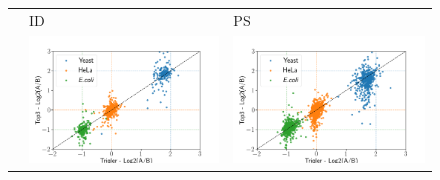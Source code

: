 \documentclass[11pt]{article}
\begin{document}
\begin{figure}[hbt]
    \centering
    \setlength{\tabcolsep}{0pt}
    \begin{tabular}{   >{\centering\arraybackslash} m{3cm} V V}
                & ID & PS \\
        {} & \includegraphics[width=\linewidth]{../../result/report_plots_pipeline/scatter_ID_triqler_vs_top3.png}  
                & \includegraphics[width=\linewidth]{../../result/report_plots_pipeline/scatter_PS_triqler_vs_top3.png} \\ 

\end{tabular}
\end{figure}
\end{document}
